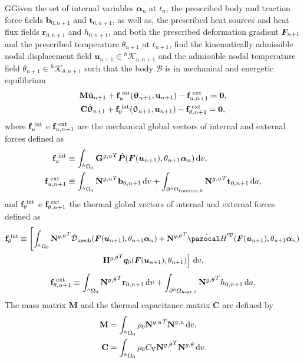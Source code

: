 \begin{problem}
GGiven the set of internal variables $\bm \alpha_n$ at $t_n$, the prescribed body and traction force fields $\bm b_{0,n+1}$ and $\bm t_{0,n+1}$, as well as, the prescribed heat sources and heat flux fields \(\bm r_{0,n+1}\) and \(h_{0,n+1}\), and both the prescribed deformation gradient $\bm{F}_{n+1}$ and the prescribed temperature \(\theta_{n+1}\) at $t_{n+1}$, find the kinematically admissible nodal displacement field $\bm u_{n+1}\in {^h\mathscr{K}_{u,n+1}}$ and the admissible nodal temperature field \(\theta_{n+1}\in{^h\mathscr{K}_{\theta,n+1}}\) such that the body $\mathscr{B}$ is in mechanical and energetic equilibrium
\begin{gather}
    \mathbf M \ddot{\mathbf u}_{n+1} +\mathbf f_u^\text{\;int}(\bm \uptheta_{n+1}, \mathbf u_{n+1})-\mathbf f^\text{\;ext}_{u,n+1}=\mathbf 0, \\
    \mathbf C \dot{\bm \uptheta}_{n+1} +\mathbf f_\theta^\text{\;int}(\bm \uptheta_{n+1}, \mathbf u_{n+1})-\mathbf f^\text{\;ext}_{\theta,n+1}=\mathbf 0,
\end{gather}
where $\mathbf f_u^\text{\;int}$ e $\mathbf f^\text{\;ext}_{u,n+1}$ are the mechanical global vectors of internal and external forces defined as
\begin{align}
    \mathbf f_u^\text{\;int} &\equiv \int_{^h\Omega_0}{\mathbf G^{g,u}}^T \hat{\bm{P}}(\bm{F}(\bm u_{n+1}), \theta_{n+1} \bm \alpha_n)\,\mathrm{d} v,\\
    \mathbf f^\text{\;ext}_{u,n+1} &\equiv \int_{^h\Omega_0}{\mathbf N^{g,u}}^T \mathbf b_{0,n+1}\,\mathrm{d} v + \int_{\partial^h\Omega_\text{traction,0}}{\mathbf N^{g,u}}^T \mathbf t_{0,n+1}\,\mathrm{d} a,
\end{align}
and $\mathbf f_\theta^\text{\;int}$ e $\mathbf f^\text{\;ext}_{\theta,n+1}$ the thermal global vectors of internal and external forces defined as
\begin{multline}
    \mathbf f_\theta^\text{\;int} \equiv \left[\int_{^h\Omega_0}{\mathbf N^{g,\theta}}^T \hat{\mathcal D}_\text{mech}(\mat F(\bm u_{n+1}), \theta_{n+1} \bm \alpha_n) +{\mathbf N^{g,\theta}}^T\hat{\pazocal H}^\text{ep}(\mat F(\bm u_{n+1}), \theta_{n+1} \bm \alpha_n)\right.\\
     \left. {\mathbf H^{g,\theta}}^T\bm q_0(\bm F(\bm u_{n+1}), \theta_{n+1})\right] \ud v,
\end{multline}
\begin{equation}
    \mathbf f^\text{\;ext}_{\theta,n+1} \equiv \int_{^h\Omega_0}{\mathbf N^{g,\theta}}^T \mathbf r_{0,n+1}\,\mathrm{d} v + \int_{\partial^h\Omega_\text{heat,0}}{\mathbf N^{g,\theta}}^T h_{0,n+1}\,\mathrm{d} a.
\end{equation}
The mass matrix $\mathbf M$ and the thermal capacitance matrix \(\mathbf C\) are defined by
\begin{align}
  \mathbf M &= \int_{{}^h\Omega_0} \rho_0 {\mathbf{N}^{g,u}}^T\mathbf{N}^{g,u} \,\mathrm{d} v,\\
  \mathbf C &= \int_{{}^h\Omega_0} \rho_0C_\mathrm{V} {\mathbf{N}^{g,\theta}}^T\mathbf{N}^{g,\theta} \,\mathrm{d} v.
\end{align}
\end{problem}

